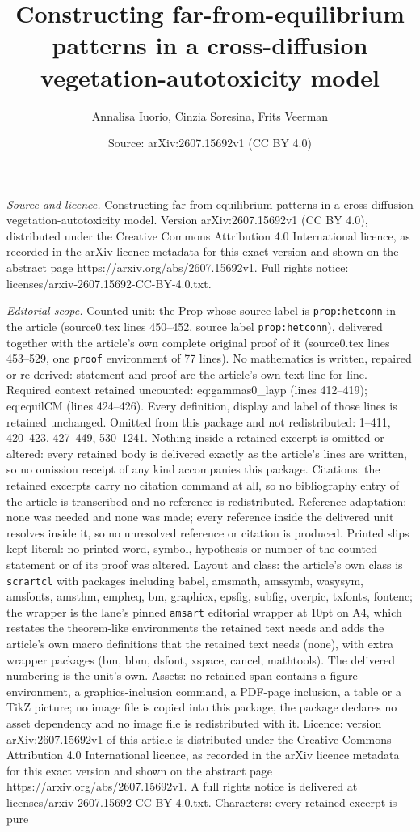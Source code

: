 \documentclass[10pt,a4paper]{amsart}
\title[Constructing far-from-equilibrium patterns in a cross-diffus]{Constructing far-from-equilibrium patterns in a cross-diffusion vegetation-autotoxicity model}
\author{Annalisa Iuorio, Cinzia Soresina, Frits Veerman}
\date{Source: arXiv:2607.15692v1 (CC BY 4.0)}
\begin{document}
\maketitle

\noindent\emph{Source and licence.} Constructing far-from-equilibrium patterns in a cross-diffusion vegetation-autotoxicity model. Version arXiv:2607.15692v1 (CC BY 4.0), distributed under the Creative Commons Attribution 4.0 International licence, as recorded in the arXiv licence metadata for this exact version and shown on the abstract page https://arxiv.org/abs/2607.15692v1. Full rights notice: licenses/arxiv-2607.15692-CC-BY-4.0.txt.\par\smallskip

\noindent\textit{Editorial scope.} Counted unit: the Prop whose source label is \texttt{prop:hetconn} in the article (source0.tex lines 450--452, source label \texttt{prop:hetconn}), delivered together with the article's own complete original proof of it (source0.tex lines 453--529, one \texttt{proof} environment of 77 lines). No mathematics is written, repaired or re-derived: statement and proof are the article's own text line for line. Required context retained uncounted: eq:gammas0\_layp (lines 412--419); eq:equilCM (lines 424--426). Every definition, display and label of those lines is retained unchanged. Omitted from this package and not redistributed: 1--411, 420--423, 427--449, 530--1241. Nothing inside a retained excerpt is omitted or altered: every retained body is delivered exactly as the article's lines are written, so no omission receipt of any kind accompanies this package. Citations: the retained excerpts carry no citation command at all, so no bibliography entry of the article is transcribed and no reference is redistributed. Reference adaptation: none was needed and none was made; every reference inside the delivered unit resolves inside it, so no unresolved reference or citation is produced. Printed slips kept literal: no printed word, symbol, hypothesis or number of the counted statement or of its proof was altered. Layout and class: the article's own class is \texttt{scrartcl} with packages including babel, amsmath, amssymb, wasysym, amsfonts, amsthm, empheq, bm, graphicx, epsfig, subfig, overpic, txfonts, fontenc; the wrapper is the lane's pinned \texttt{amsart} editorial wrapper at 10pt on A4, which restates the theorem-like environments the retained text needs and adds the article's own macro definitions that the retained text needs (none), with extra wrapper packages (bm, bbm, dsfont, xspace, cancel, mathtools). The delivered numbering is the unit's own. Assets: no retained span contains a figure environment, a graphics-inclusion command, a PDF-page inclusion, a table or a TikZ picture; no image file is copied into this package, the package declares no asset dependency and no image file is redistributed with it. Licence: version arXiv:2607.15692v1 of this article is distributed under the Creative Commons Attribution 4.0 International licence, as recorded in the arXiv licence metadata for this exact version and shown on the abstract page https://arxiv.org/abs/2607.15692v1. A full rights notice is delivered at licenses/arxiv-2607.15692-CC-BY-4.0.txt. Characters: every retained excerpt is pure 
\end{document}
